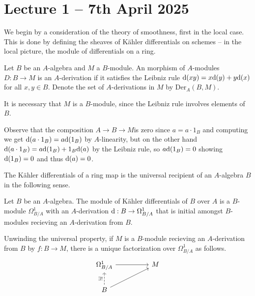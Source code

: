 \section{Lecture 1 -- 7th April 2025}\label{sec: lectuer 1}
We begin by a consideration of the theory of smoothness, first in the local case. This is done by defining the sheaves of K\"{a}hler differentials on schemes -- in the local picture, the module of differentials on a ring. 
\begin{definition}[Derivation]\label{def: derivation}
    Let $B$ be an $A$-algebra and $M$ a $B$-module. An morphism of $A$-modules $D:B\to M$ is an $A$-derivation if it satisfies the Leibniz rule $\mathrm{d}(xy)=x\mathrm{d}(y)+y\mathrm{d}(x)$ for all $x,y\in B$. Denote the set of $A$-derivations in $M$ by $\mathrm{Der}_{A}(B,M)$. 
\end{definition}
\begin{remark}
    It is necessary that $M$ is a $B$-module, since the Leibniz rule involves elements of $B$. 
\end{remark}
\begin{remark}\label{rmk: map from A is zero}
    Observe that the composition $A\to B\to M$is zero since $a=a\cdot 1_{B}$ and computing we get $\mathrm{d}(a\cdot 1_{B})=a\mathrm{d}(1_{B})$ by $A$-linearity, but on the other hand $\mathrm{d}(a\cdot 1_{B})=a\mathrm{d}(1_{B})+1_{B}\mathrm{d}(a)$ by the Leibniz rule, so $a\mathrm{d}(1_{B})=0$ showing $\mathrm{d}(1_{B})=0$ and thus $\mathrm{d}(a)=0$. 
\end{remark}
The K\"{a}hler differentials of a ring map is the universal recipient of an $A$-algebra $B$ in the following sense. 
\begin{definition}
    Let $B$ be an $A$-algebra. The module of K\"{a}hler differentials of $B$ over $A$ is a $B$-module $\Omega^{1}_{B/A}$ with an $A$-derivation $\mathrm{d}:B\to\Omega_{B/A}^{1}$ that is initial amongst $B$-modules recieving an $A$-derivation from $B$. 
\end{definition}
Unwinding the universal property, if $M$ is a $B$-module recieving an $A$-derivation from $B$ by $f:B\to M$, there is a unique factorization over $\Omega^{1}_{B/A}$ as follows.
$$%
\begin{tikzcd}
	{\Omega^{1}_{B/A}} && M \\
	B
	\arrow[from=1-1, to=1-3]
	\arrow["{\exists!}", dashed, from=2-1, to=1-1]
	\arrow[from=2-1, to=1-3]
\end{tikzcd}$$
